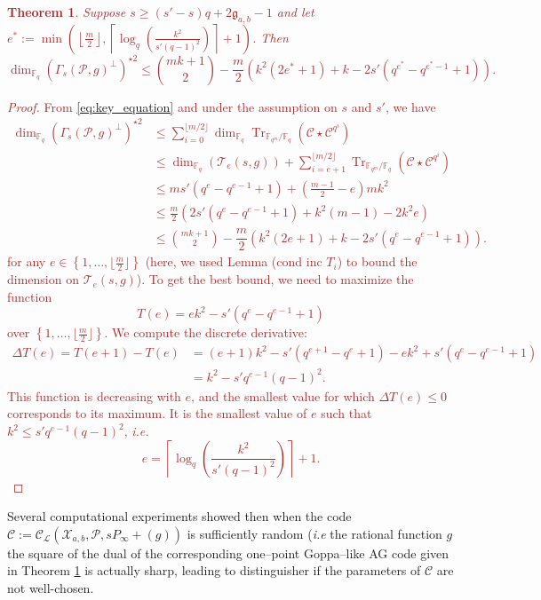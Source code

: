 \documentclass[a4paper]{article}
\newtheorem{thm}{Theorem}[section]
\theoremstyle{definition}
\theoremstyle{remark}
\newcommand{\calP}{\mathcal{P}}
\newcommand{\calL}{\mathcal{L}}
\newcommand{\calC}{\mathcal{C}}
\newcommand{\calT}{\mathcal{T}}
\newcommand{\calX}{\mathcal{X}}
\newcommand{\fq}{\mathbb{F}_{q}}
\newcommand{\Tr}[1]{\operatorname{Tr}_{\mathbb{F}_{q^m}/\fq}\left(#1\right)}
\newcommand{\set}[1]{\left\{#1\right\}}
\newcommand\mathieu[1]{\textcolor{brown}{#1}}
\begin{document}
\mathieu{
\begin{thm} \label{thm:bound_with_T_i's_inclusion}
Suppose $s \geq (s'-s)q+2\mathfrak{g}_{a,b}-1$ and let $e^* := \min\left(\left\lfloor \frac{m}{2} \right\rfloor, \left\lceil \log_q\left(\frac{k^2}{s'(q-1)^2}\right)\right\rceil+1\right)$. Then
$$\dim_{\fq} (\Gamma_s(\calP,g)^{\perp})^{\star 2}\leq \binom{mk+1}{2} - \dfrac{m}{2}(k^2(2e^*+1)+k-2s'(q^{e^*}-q^{e^*-1}+1)). $$
\end{thm}}
\mathieu{
\begin{proof}
    From \eqref{eq:key_equation} and under the assumption on $s$ and $s'$, we have
        \begin{align*}
        \dim_{\fq} (\Gamma_s(\calP,g)^{\perp})^{\star 2}
        & \leq \sum\limits_{i=0}^{\lfloor m/2 \rfloor} \dim_{\fq} \Tr{\calC \star \calC^{q^i}} \\
        & \leq \dim_{\fq} (\calT_e(s,g)) + \sum\limits_{i=e+1}^{\lfloor m/2 \rfloor} \Tr{\calC \star \calC^{q^i}} \\
        & \leq ms'(q^e-q^{e-1}+1) + \left( \frac{m-1}{2} -e \right)mk^2 \\
        & \leq \frac{m}{2}\left(2s'(q^e-q^{e-1}+1)+k^2(m-1)-2k^2e  \right) \\
        & \leq \binom{mk+1}{2} -  \dfrac{m}{2}\left(k^2(2e+1)+k-2s'(q^e-q^{e-1}+1)\right).
    \end{align*}
for any $e \in \set{1,\dots,\lfloor \frac{m}{2} \rfloor}$ (here, we used Lemma (cond inc $T_i$) to bound the dimension on $\calT_e(s,g)$).
To get the best bound, we need to maximize the function
$$T(e) = ek^2-s'(q^e-q^{e-1}+1)$$
over $\set{1,\dots,\lfloor \frac{m}{2} \rfloor}$.
We compute the discrete derivative:
\begin{align*}
    \Delta T(e) = T(e+1)-T(e) &= (e+1)k^2- s'(q^{e+1}-q^e+1) - ek^2 + s'(q^e-q^{e-1}+1) \\
                              &= k^2 - s'q^{e-1}(q-1)^2.
\end{align*}
This function is decreasing with $e$, and the smallest value for which $\Delta T(e) \leq 0$ corresponds to its maximum. It is the smallest value of $e$ such that $k^2 \leq s'q^{e-1}(q-1)^2$, \emph{i.e.}
$$e =  \left\lceil \log_q\left(\dfrac{k^2}{s'(q-1)^2}\right)\right\rceil+1.$$
\end{proof}}

\noindent Several computational experiments showed then when the code $\calC:=\calC_{\calL}(\calX_{a,b},\calP,sP_\infty+(g))$ is sufficiently random (\emph{i.e} the rational function $g$ the square of the dual of the corresponding one--point Goppa--like AG code given in Theorem \ref{thm:bound_with_T_i's_inclusion} is actually sharp, leading to  distinguisher if the parameters of $\calC$ are not well-chosen. \\
\end{document}
